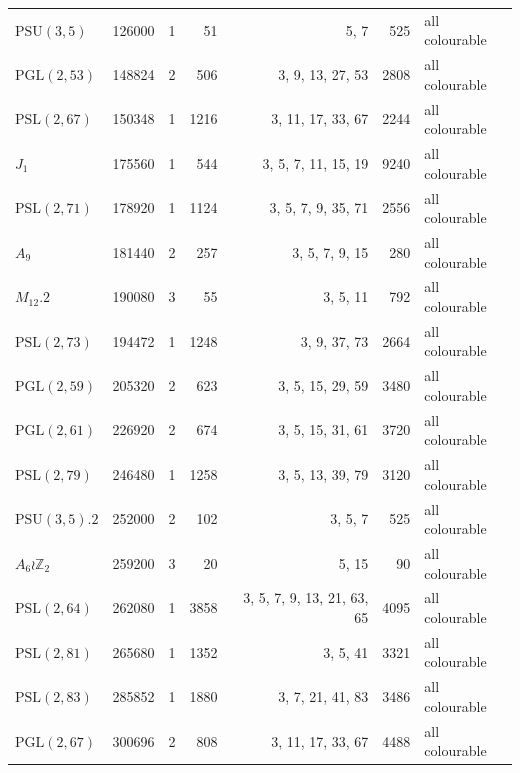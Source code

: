 \begin{tabular}{@{}lrrrrrl@{}}
$\mathrm{PSU}(3,5)$ & 126000 & 1 & 51 & 5, 7 & 525 & all colourable\\
$\mathrm{PGL}(2,53)$ & 148824 & 2 & 506 & 3, 9, 13, 27, 53 & 2808 & all colourable\\
$\mathrm{PSL}(2,67)$ & 150348 & 1 & 1216 & 3, 11, 17, 33, 67 & 2244 & all colourable\\
$J_1$ & 175560 & 1 & 544 & 3, 5, 7, 11, 15, 19 & 9240 & all colourable\\
$\mathrm{PSL}(2,71)$ & 178920 & 1 & 1124 & 3, 5, 7, 9, 35, 71 & 2556 & all colourable\\
$A_9$ & 181440 & 2 & 257 & 3, 5, 7, 9, 15 & 280 & all colourable\\
$M_{12}.2$ & 190080 & 3 & 55 & 3, 5, 11 & 792 & all colourable\\
$\mathrm{PSL}(2,73)$ & 194472 & 1 & 1248 & 3, 9, 37, 73 & 2664 & all colourable\\
$\mathrm{PGL}(2,59)$ & 205320 & 2 & 623 & 3, 5, 15, 29, 59 & 3480 & all colourable\\
$\mathrm{PGL}(2,61)$ & 226920 & 2 & 674 & 3, 5, 15, 31, 61 & 3720 & all colourable\\
$\mathrm{PSL}(2,79)$ & 246480 & 1 & 1258 & 3, 5, 13, 39, 79 & 3120 & all colourable\\
$\mathrm{PSU}(3,5).2$ & 252000 & 2 & 102 & 3, 5, 7 & 525 & all colourable\\
$A_6\wr\mathbb{Z}_2$ & 259200 & 3 & 20 & 5, 15 & 90 & all colourable\\
$\mathrm{PSL}(2,64)$ & 262080 & 1 & 3858 & 3, 5, 7, 9, 13, 21, 63, 65 & 4095 & all colourable\\
$\mathrm{PSL}(2,81)$ & 265680 & 1 & 1352 & 3, 5, 41 & 3321 & all colourable\\
$\mathrm{PSL}(2,83)$ & 285852 & 1 & 1880 & 3, 7, 21, 41, 83 & 3486 & all colourable\\
$\mathrm{PGL}(2,67)$ & 300696 & 2 & 808 & 3, 11, 17, 33, 67 & 4488 & all colourable\\
\bottomrule
\end{tabular}
